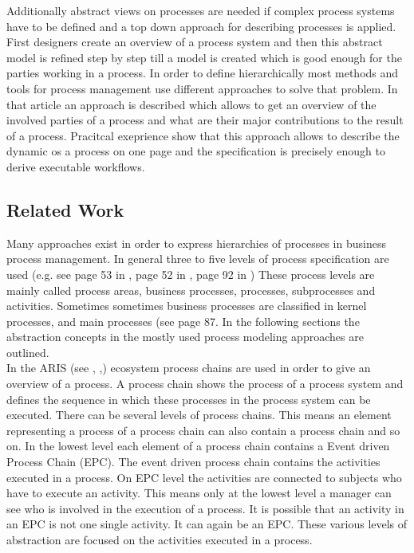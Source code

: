 Additionally abstract views on processes are needed if complex process systems have to be defined and a top down approach for describing processes is applied. First designers create an overview of a process system and then this abstract model is refined step by step till a model is created which is good enough for the parties working in a process. In order to define hierarchically most methods and tools for process management use different approaches to solve that problem.
In that article an approach is described which allows to get an overview of the involved parties of a process and what are their major contributions to the result of a process. Pracitcal exeprience show that this approach allows to describe the dynamic os a process on one page and the specification is precisely enough to derive executable workflows.

\subsection{Related Work}
Many approaches exist in order to express hierarchies of processes in business process management. In general three to five levels of process specification are used (e.g. see page 53 in \cite{book:Worklow-Mod}, page 52 in \cite{book:Prozessmgmt-umsetzen}, page 92 in \cite{book:EnterpriseBPM}) These process levels are mainly called process areas, business processes, processes, subprocesses and activities. Sometimes sometimes business processes are classified in kernel processes, and main processes (see \cite{book:EnterpriseBPM} page 87. 
In the following sections the abstraction concepts in the mostly used process modeling approaches are outlined.\\

In the ARIS (see \cite{book:ARIS}, \cite{book:SAPRoadmap},\cite{book:EnterpriseBPM}) ecosystem process chains are used in order to give an overview of a process. A process chain shows the process of a process system and defines the sequence in which these processes in the process system can be executed.  There can be several levels of process chains. This means an element representing a process of a process chain can also contain a process chain and so on.  In the lowest level each element of a process chain contains a Event driven Process Chain (EPC). The event driven process chain contains the activities executed in a process. On EPC level the activities are connected to subjects who have to execute an activity. This means only at the lowest level a manager can see who is involved in the execution of a process. It is possible that an activity in an EPC is not one single activity. It can again be an EPC. These various levels of abstraction are focused on the activities executed in a process.\\

